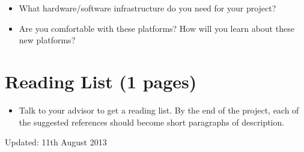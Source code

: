 \begin{itemize}
\itemsep1pt\parskip0pt
\item
  What hardware/software infrastructure do you need for your
  project?
\item
  Are you comfortable with these platforms? How will you
  learn about these new platforms?
\end{itemize}

\section{Reading List (1 pages)}

\begin{itemize}
\itemsep1pt\parskip0pt
\item
  Talk to your advisor to get a reading list. By the end of
  the project, each of the suggested references should
  become short paragraphs of description.
\end{itemize}

 Updated: 11th August 2013 
